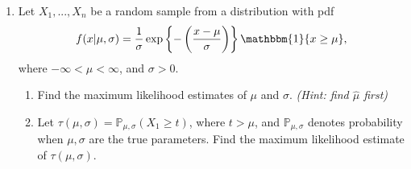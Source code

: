 \documentclass[11pt]{article}
\begin{document}
\begin{enumerate}
\item Let $X_1,...,X_n$ be a random sample from a distribution with pdf
$$f(x | \mu, \sigma) = \frac{1}{\sigma} \exp \left \lbrace - \left( \dfrac{x - \mu}{\sigma} \right) \right \rbrace \mathbbm{1}\{x \geq \mu \},$$
where $-\infty < \mu < \infty$, and $\sigma > 0$.

\begin{enumerate}
\item Find the maximum likelihood estimates of $\mu$ and $\sigma$. \textit{(Hint: find $\widehat{\mu}$ first)}

\item Let $\tau(\mu, \sigma) = \mathbb{P}_{\mu, \sigma}(X_1 \geq t)$, where $t > \mu$, and $\mathbb{P}_{\mu, \sigma}$ denotes probability when $\mu, \sigma$ are the true parameters. Find the maximum likelihood estimate of $\tau(\mu, \sigma)$.
\end{enumerate}
\end{enumerate}
\end{document}
